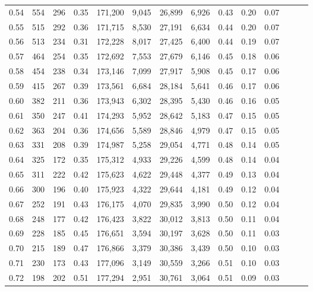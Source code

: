 \begin{tabular}{rrrrrrrrrrrrrr}
0.54 &    554 &  296 &  0.35 &  171,200 &    9,045 &  26,899 &   6,926 &  0.43 &  0.20 &      0.07 \\
0.55 &    515 &  292 &  0.36 &  171,715 &    8,530 &  27,191 &   6,634 &  0.44 &  0.20 &      0.07 \\
0.56 &    513 &  234 &  0.31 &  172,228 &    8,017 &  27,425 &   6,400 &  0.44 &  0.19 &      0.07 \\
0.57 &    464 &  254 &  0.35 &  172,692 &    7,553 &  27,679 &   6,146 &  0.45 &  0.18 &      0.06 \\
0.58 &    454 &  238 &  0.34 &  173,146 &    7,099 &  27,917 &   5,908 &  0.45 &  0.17 &      0.06 \\
0.59 &    415 &  267 &  0.39 &  173,561 &    6,684 &  28,184 &   5,641 &  0.46 &  0.17 &      0.06 \\
0.60 &    382 &  211 &  0.36 &  173,943 &    6,302 &  28,395 &   5,430 &  0.46 &  0.16 &      0.05 \\
0.61 &    350 &  247 &  0.41 &  174,293 &    5,952 &  28,642 &   5,183 &  0.47 &  0.15 &      0.05 \\
0.62 &    363 &  204 &  0.36 &  174,656 &    5,589 &  28,846 &   4,979 &  0.47 &  0.15 &      0.05 \\
0.63 &    331 &  208 &  0.39 &  174,987 &    5,258 &  29,054 &   4,771 &  0.48 &  0.14 &      0.05 \\
0.64 &    325 &  172 &  0.35 &  175,312 &    4,933 &  29,226 &   4,599 &  0.48 &  0.14 &      0.04 \\
0.65 &    311 &  222 &  0.42 &  175,623 &    4,622 &  29,448 &   4,377 &  0.49 &  0.13 &      0.04 \\
0.66 &    300 &  196 &  0.40 &  175,923 &    4,322 &  29,644 &   4,181 &  0.49 &  0.12 &      0.04 \\
0.67 &    252 &  191 &  0.43 &  176,175 &    4,070 &  29,835 &   3,990 &  0.50 &  0.12 &      0.04 \\
0.68 &    248 &  177 &  0.42 &  176,423 &    3,822 &  30,012 &   3,813 &  0.50 &  0.11 &      0.04 \\
0.69 &    228 &  185 &  0.45 &  176,651 &    3,594 &  30,197 &   3,628 &  0.50 &  0.11 &      0.03 \\
0.70 &    215 &  189 &  0.47 &  176,866 &    3,379 &  30,386 &   3,439 &  0.50 &  0.10 &      0.03 \\
0.71 &    230 &  173 &  0.43 &  177,096 &    3,149 &  30,559 &   3,266 &  0.51 &  0.10 &      0.03 \\
0.72 &    198 &  202 &  0.51 &  177,294 &    2,951 &  30,761 &   3,064 &  0.51 &  0.09 &      0.03 \\

\end{tabular}
